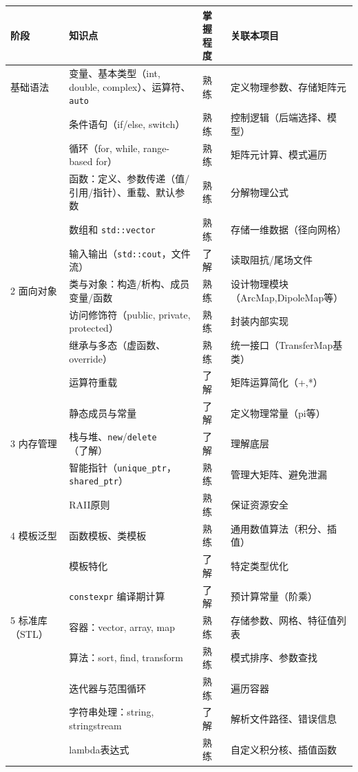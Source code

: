 \documentclass[12pt,a4paper]{article}
\begin{document}
{\small
\begin{longtable}{p{3.5cm}p{2.5cm}p{1.8cm}p{7cm}}
\toprule
阶段 & 知识点 & 掌握程度 & 关联本项目 \\
\midrule
\endhead
\bottomrule
\endfoot
1 基础语法 & 变量、基本类型（int, double, complex）、运算符、\texttt{auto} & 熟练 & 定义物理参数、存储矩阵元 \\
& 条件语句（if/else, switch） & 熟练 & 控制逻辑（后端选择、模型） \\
& 循环（for, while, range-based for） & 熟练 & 矩阵元计算、模式遍历 \\
& 函数：定义、参数传递（值/引用/指针）、重载、默认参数 & 熟练 & 分解物理公式 \\
& 数组和 \texttt{std::vector} & 熟练 & 存储一维数据（径向网格） \\
& 输入输出（\texttt{std::cout}，文件流） & 了解 & 读取阻抗/尾场文件 \\
\midrule
2 面向对象 & 类与对象：构造/析构、成员变量/函数 & 熟练 & 设计物理模块（ArcMap,DipoleMap等） \\
& 访问修饰符（public, private, protected） & 熟练 & 封装内部实现 \\
& 继承与多态（虚函数、override） & 熟练 & 统一接口（TransferMap基类） \\
& 运算符重载 & 了解 & 矩阵运算简化（+,*） \\
& 静态成员与常量 & 了解 & 定义物理常量（pi等） \\
\midrule
3 内存管理 & 栈与堆、\texttt{new}/\texttt{delete}（了解） & 了解 & 理解底层 \\
& 智能指针（\texttt{unique\_ptr}，\texttt{shared\_ptr}） & 熟练 & 管理大矩阵、避免泄漏 \\
& RAII原则 & 熟练 & 保证资源安全 \\
\midrule
4 模板泛型 & 函数模板、类模板 & 熟练 & 通用数值算法（积分、插值） \\
& 模板特化 & 了解 & 特定类型优化 \\
& \texttt{constexpr} 编译期计算 & 了解 & 预计算常量（阶乘） \\
\midrule
5 标准库（STL） & 容器：vector, array, map & 熟练 & 存储参数、网格、特征值列表 \\
& 算法：sort, find, transform & 熟练 & 模式排序、参数查找 \\
& 迭代器与范围循环 & 熟练 & 遍历容器 \\
& 字符串处理：string, stringstream & 了解 & 解析文件路径、错误信息 \\
& lambda表达式 & 熟练 & 自定义积分核、插值函数 \\

\end{longtable}}
\end{document}
